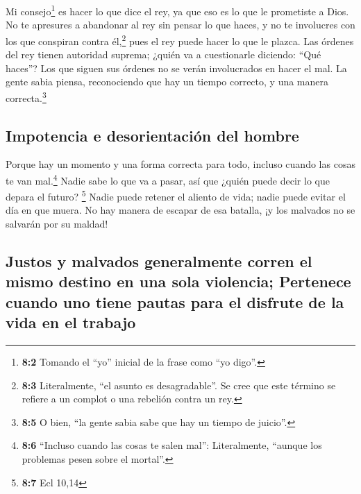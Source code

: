  Mi consejo\footnote{\textbf{8:2} Tomando el ``yo''
  inicial de la frase como ``yo digo''.} es hacer lo que dice el rey, ya
que eso es lo que le prometiste a Dios.  No te apresures a
abandonar al rey sin pensar lo que haces, y no te involucres con los que
conspiran contra él,\footnote{\textbf{8:3} Literalmente, ``el asunto es
  desagradable''. Se cree que este término se refiere a un complot o una
  rebelión contra un rey.} pues el rey puede hacer lo que le plazca.
 Las órdenes del rey tienen autoridad suprema; ¿quién va a
cuestionarle diciendo: ``Qué haces''?  Los que siguen sus
órdenes no se verán involucrados en hacer el mal. La gente sabia piensa,
reconociendo que hay un tiempo correcto, y una manera
correcta.\footnote{\textbf{8:5} O bien, ``la gente sabia sabe que hay un
  tiempo de juicio''.}

\hypertarget{impotencia-e-desorientaciuxf3n-del-hombre}{%
\subsection{Impotencia e desorientación del
hombre}\label{impotencia-e-desorientaciuxf3n-del-hombre}}

 Porque hay un momento y una forma correcta para todo,
incluso cuando las cosas te van mal.\footnote{\textbf{8:6} ``Incluso
  cuando las cosas te salen mal'': Literalmente, ``aunque los problemas
  pesen sobre el mortal''.}  Nadie sabe lo que va a pasar,
así que ¿quién puede decir lo que depara el futuro? \footnote{\textbf{8:7}
  Ecl 10,14}  Nadie puede retener el aliento de vida;
nadie puede evitar el día en que muera. No hay manera de escapar de esa
batalla, ¡y los malvados no se salvarán por su maldad!

\hypertarget{justos-y-malvados-generalmente-corren-el-mismo-destino-en-una-sola-violencia-pertenece-cuando-uno-tiene-pautas-para-el-disfrute-de-la-vida-en-el-trabajo}{%
\subsection{Justos y malvados generalmente corren el mismo destino en
una sola violencia; Pertenece cuando uno tiene pautas para el disfrute
de la vida en el
trabajo}\label{justos-y-malvados-generalmente-corren-el-mismo-destino-en-una-sola-violencia-pertenece-cuando-uno-tiene-pautas-para-el-disfrute-de-la-vida-en-el-trabajo}}

